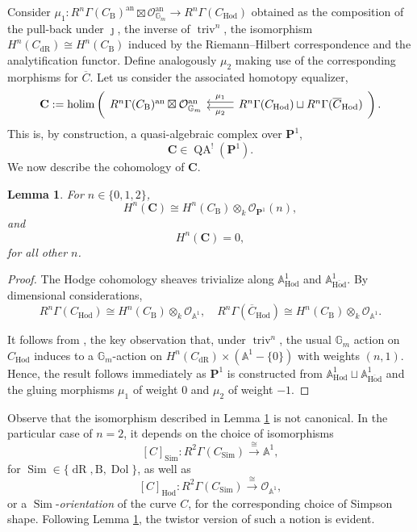 \documentclass[11pt, a4paper]{amsart}
\numberwithin{equation}{section}
\newtheorem{lemma}[theorem]{Lemma}
\theoremstyle{definition}
\theoremstyle{remark}
\DeclareMathOperator{\an}{an}
\DeclareMathOperator{\triv}{triv}
\DeclareMathOperator{\Dol}{Dol}
\DeclareMathOperator{\dR}{dR}
\DeclareMathOperator{\Hod}{Hod}
\DeclareMathOperator{\Sim}{Sim}
\DeclareMathOperator{\QA}{QA}
\newcommand{\Oo}{\mathcal{O}}
\newcommand{\C}{\mathbf{C}}
\newcommand{\B}{\mathrm{B}}
\renewcommand{\P}{\mathbf{P}}
\newcommand{\ol}[1]{\overline{#1}}
\renewcommand{\AA}{\mathbb{A}}
\newcommand{\GG}{\mathbb{G}}
\renewcommand{\to}{\longrightarrow}
\begin{document}
Consider $\mu_1 : R^n\Gamma(C_{\B})^{\an} \boxtimes \Oo_{\GG_m}^{\an} \to R^n\Gamma(C_{\Hod})$ obtained as the composition of the pull-back under $\jmath$, the inverse of $\triv^n$, the isomorphism $H^n(C_{\dR}) \cong H^n(C_{\B})$ induced by the Riemann--Hilbert correspondence and the analytification functor. Define analogously $\mu_2$ making use of the corresponding morphisms for $\ol{C}$. Let us consider the associated homotopy equalizer,
\[
\C := \mathrm{holim} \left ( \begin{tikzcd}
	R^n\Gamma(C_{\B})^{\an} \boxtimes \Oo_{\GG_m}^{\an}   &  R^n\Gamma(C_{\Hod}) \sqcup R^n\Gamma(\ol{C}_{\Hod})
	\arrow["{\mu_1}"', shift right, from=1-2, to=1-1]
	\arrow["{\mu_2}", shift left, from=1-2, to=1-1]
\end{tikzcd} \right ).
\]
This is, by construction, a quasi-algebraic complex over $\P^1$,
\[
\C \in \QA^!(\P^1).
\]
We now describe the cohomology of $\C$.

\begin{lemma} \label{lm cohomology of the curve}
For $n \in \{ 0, 1, 2 \}$, 
\[
H^n(\C) \cong H^n(C_{\B}) \otimes_k \Oo_{\P^1}(n),
\]
and 
\[
H^n(\C) = 0,
\]
for all other $n$.
\end{lemma}

\begin{proof}
The Hodge cohomology sheaves trivialize along $\AA^1_{\Hod}$ and $\AA^1_{\ol \Hod}$. By dimensional considerations,
\[
R^n\Gamma(C_{\Hod}) \cong H^n(C_{\B}) \otimes_k \Oo_{\AA^1}, \quad R^n\Gamma(\ol{C}_{\Hod}) \cong H^n(C_{\B}) \otimes_k \Oo_{\AA^1}.
\]

It follows from \cite{lurie_ff_curve}, the key observation that, under $\triv^n$, the usual $\GG_m$ action on $C_{\Hod}$ induces to a $\GG_m$-action on $H^n(C_{\dR}) \times (\AA^1 - \{ 0 \} )$ with weights $(n,1)$. Hence, the result follows immediately as $\P^1$ is constructed from $\AA^1_{\Hod} \sqcup \AA^1_{\ol\Hod}$ and the gluing morphisms $\mu_1$ of weight $0$ and $\mu_2$ of weight $-1$. 
\end{proof}


Observe that the isomorphism described in Lemma \ref{lm cohomology of the curve} is not canonical. In the particular case of $n = 2$, it depends on the choice of isomorphisms 
\[
[C]_{\Sim}: R^2\Gamma(C_{\Sim}) \stackrel{\cong}{\to} \AA^1,
\]
for $\Sim \in \{\dR, \B, \Dol\}$, as well as  
\[
[C]_{\Hod} : R^2\Gamma(C_{\Sim}) \stackrel{\cong}{\to} \Oo_{\AA^1}, 
\]
or a $\Sim$-{\it orientation} of the curve $C$, for the corresponding choice of Simpson shape. Following Lemma \ref{lm cohomology of the curve}, the twistor version of such a notion is evident. 
\end{document}
